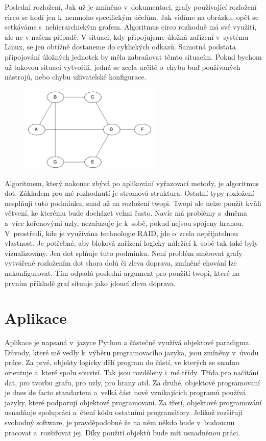 \documentclass[color,table,oneside,nolot,nolof]{fithesis}
\begin{document}
	Poslední rozložení, \cite{graphviz_layout} 
	Jak už je zmíněno v~dokumentaci, grafy používající rozložení 
	circo se hodí jen k~nemnoho specifickým účelům. Jak vidíme na obrázku, opět se setkáváme s~nehierarchickým grafem. Algoritmus circo rozhodně má své využití, ale ne v našem případě. V
	situaci, kdy připojujeme úložná zařízení v~systému Linux, se jen obtížně dostaneme do cyklických odkazů. Samotná podstata připojování úložných jednotek by měla zabraňovat těmto
	situacím. Pokud bychom už takovou situaci vytvořili, jedná se zcela určitě o~chybu buď používaných nástrojů, nebo chybu uživatelské konfigurace. 
\begin{figure}
	\centering
	\includegraphics[width=0.6\textwidth]{pictures/circo_example.png} 
\end{figure}

	Algoritmem, který nakonec zbývá po aplikování vyřazovací metody, je algoritmus dot. 
	Základem pro mé rozhodnutí je stromová struktura. Ostatní typy rozložení nesplňují tuto podmínku, snad až na rozložení twopi. Twopi ale nelze použít kvůli větvení,
	ke kterému bude docházet velmi často. Navíc má problémy s~dměma a~více kořenovými uzly, nezařazuje je k~sobě, pokud nejsou spojeny hranou. V~prostředí, kde je využívána technologie
	RAID, jde o~zcela nepřijatelnou vlastnost. Je potřebné, aby bloková zařízení logicky náležící k~sobě tak také byly vizualizovány. Jen dot splňuje tuto podmínku. Není problém směrovat grafy 
	vytvářené rozložením dot shora dolů či zleva doprava, zmíněné chování lze nakonfigurovat. Tím odpadá poslední argument pro použití twopi, které na prvním příkladě graf situuje jako
	jdoucí zleva doprava.

\chapter{Aplikace}
	Aplikace je napsaná v~jazyce Python a částečně využívá objektové paradigma. Důvody, které mě vedly k~výběru programovacího jazyka, jsou zmíněny v~úvodu práce. Za prvé, objekty logicky
	dělí program do částí, ve kterých se snadno orientuje a~které spolu souvisí. Tak jsou rozděleny i~mé třídy. Třída pro načítání dat, pro tvorbu grafu, pro uzly, pro hrany atd.
	Za druhé, objektové programovaní je dnes de facto standartem a~velká část nově vznikajících programů používá jazyky, které podporují objektové programovaní. Za třetí,
	objektové programování usnadňuje spolupráci a~čtení kódu ostatními programátory. Jelikož rozšiřuji svobodný software, je pravděpodobné že na něm někdo bude v~budoucnu pracovat
	a~rozšiřovat jej. Díky použití objektů bude mít usnadněnou práci.
	
\end{document}
